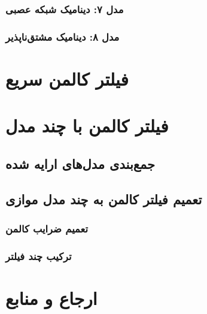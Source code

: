 \documentclass{scribe-cgenomics}
\begin{document}
\subsubsection{مدل ۷: دینامیک شبکه عصبی}
\subsubsection{مدل ۸: دینامیک مشتق‌ناپذیر}


\section{فیلتر کالمن سریع}


\section{فیلتر کالمن با چند مدل}
\subsection{جمع‌بندی مدل‌های ارایه شده}
\subsection{تعمیم فیلتر کالمن به چند مدل موازی}
\subsubsection{تعمیم ضرایب کالمن}
\subsubsection{ترکیب چند فیلتر}

\section{ارجاع و منابع}




\end{document}
